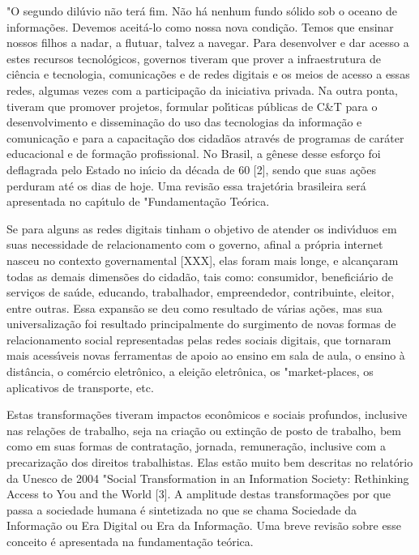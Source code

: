 \documentclass[
12pt,		%
openright,	%
twoside,  %
a4paper,			%
chapter=TITLE,		%
english,			%
french,				%
spanish,			%
brazil				%
]{USPSC-classe/USPSC}
\begin{document}
"O segundo dil\'uvio n\~ao ter\'a fim. N\~ao h\'a nenhum fundo s\'olido sob o oceano de informa\c{c}\~oes. Devemos aceit\'a-lo como nossa nova condi\c{c}\~ao. Temos que ensinar nossos filhos a nadar, a flutuar, talvez a navegar.
Para desenvolver e dar acesso a estes recursos tecnol\'ogicos,  governos tiveram que prover a infraestrutura de ci\^encia e tecnologia, comunica\c{c}\~oes e de redes digitais e os meios de acesso a essas redes, algumas vezes com a participa\c{c}\~ao da iniciativa privada. Na outra ponta, tiveram que promover projetos, formular pol\'{\i}ticas p\'ublicas de C\&T para o desenvolvimento e  dissemina\c{c}\~ao do uso das tecnologias da informa\c{c}\~ao e comunica\c{c}\~ao e para a capacita\c{c}\~ao dos cidad\~aos atrav\'es de programas de car\'ater educacional e de forma\c{c}\~ao profissional. No Brasil, a g\^enese desse esfor\c{c}o foi deflagrada pelo Estado no in\'{\i}cio da d\'ecada de 60 [2], sendo que suas a\c{c}\~oes perduram at\'e os dias de hoje. Uma revis\~ao essa trajet\'oria brasileira ser\'a apresentada no cap\'{\i}tulo de "Fundamenta\c{c}\~ao Te\'orica.




Se para alguns as redes digitais tinham o objetivo de atender os indiv\'{\i}duos em suas necessidade de relacionamento com o governo, afinal a pr\'opria internet nasceu no contexto governamental [XXX], elas foram mais longe, e alcan\c{c}aram todas as demais dimens\~oes do cidad\~ao, tais como: consumidor, benefici\'ario de servi\c{c}os de sa\'ude, educando, trabalhador, empreendedor, contribuinte, eleitor, entre outras.  Essa expans\~ao se deu como resultado de v\'arias a\c{c}\~oes, mas sua universaliza\c{c}\~ao foi resultado principalmente do surgimento de novas formas de relacionamento social representadas pelas redes sociais digitais, que tornaram mais acess\'{\i}veis novas ferramentas de apoio ao ensino em sala de aula, o ensino \`a dist\^ancia, o com\'ercio eletr\^onico, a elei\c{c}\~ao eletr\^onica, os "market-places, os aplicativos de transporte, etc. 




Estas transforma\c{c}\~oes tiveram impactos econ\^omicos e sociais profundos, inclusive nas rela\c{c}\~oes de trabalho, seja na cria\c{c}\~ao ou extin\c{c}\~ao de posto de trabalho, bem como em suas formas de contrata\c{c}\~ao, jornada, remunera\c{c}\~ao, inclusive com a precariza\c{c}\~ao dos direitos trabalhistas. Elas est\~ao muito bem descritas  no relat\'orio da Unesco  de 2004 "Social Transformation in an Information Society: Rethinking Access to You and the World [3]. A amplitude destas  transforma\c{c}\~oes por que passa a sociedade humana \'e sintetizada no que se chama  Sociedade da Informa\c{c}\~ao ou  Era Digital ou Era da Informa\c{c}\~ao. Uma breve revis\~ao sobre esse conceito  \'e apresentada na fundamenta\c{c}\~ao te\'orica. 
\end{document}
